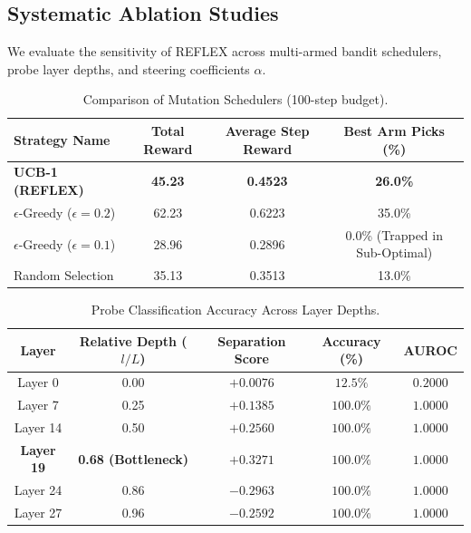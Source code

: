 \documentclass[manuscript,screen,review,anonymous]{acmart}
\begin{document}
\subsection{Systematic Ablation Studies}
We evaluate the sensitivity of REFLEX across multi-armed bandit schedulers, probe layer depths, and steering coefficients $\alpha$.

\begin{table}[t]
  \caption{Comparison of Mutation Schedulers (100-step budget).}
  \label{tab:bandit_ablation}
  \begin{tabular}{lccc}
    \toprule
    Strategy Name & Total Reward & Average Step Reward & Best Arm Picks (\%) \\
    \midrule
    \textbf{UCB-1 (REFLEX)}~\cite{auer2002finite} & \textbf{45.23} & \textbf{0.4523} & \textbf{26.0\%} \\
    $\epsilon$-Greedy ($\epsilon=0.2$) & 62.23 & 0.6223 & 35.0\% \\
    $\epsilon$-Greedy ($\epsilon=0.1$) & 28.96 & 0.2896 & \phantom{0}0.0\% (Trapped in Sub-Optimal) \\
    Random Selection & 35.13 & 0.3513 & 13.0\% \\
    \bottomrule
  \end{tabular}
\end{table}

\begin{table}[t]
  \caption{Probe Classification Accuracy Across Layer Depths.}
  \label{tab:probe_depth_ablation}
  \begin{tabular}{ccccc}
    \toprule
    Layer & Relative Depth ($l/L$) & Separation Score & Accuracy (\%) & AUROC \\
    \midrule
    Layer 0  & 0.00 & $+0.0076$ & $12.5\%$ & $0.2000$ \\
    Layer 7  & 0.25 & $+0.1385$ & $100.0\%$ & $1.0000$ \\
    Layer 14 & 0.50 & $+0.2560$ & $100.0\%$ & $1.0000$ \\
    \textbf{Layer 19} & \textbf{0.68 (Bottleneck)} & $\mathbf{+0.3271}$ & $\mathbf{100.0\%}$ & $\mathbf{1.0000}$ \\
    Layer 24 & 0.86 & $-0.2963$ & $100.0\%$ & $1.0000$ \\
    Layer 27 & 0.96 & $-0.2592$ & $100.0\%$ & $1.0000$ \\
    \bottomrule
  \end{tabular}
\end{table}
\end{document}
